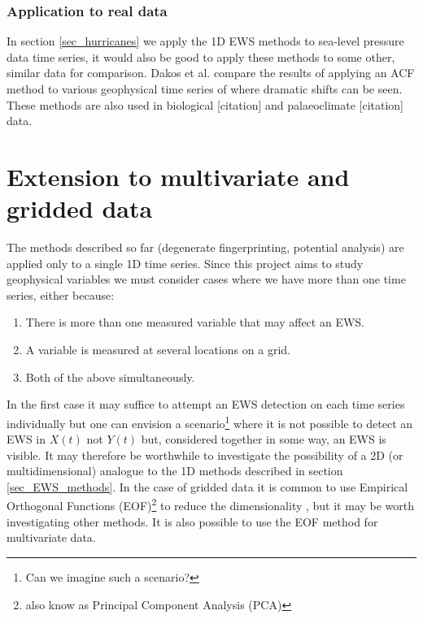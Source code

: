 \documentclass[11pt,a4paper,reqno]{article}
\numberwithin{equation}{section}
\begin{document}
\subsubsection{Application to real data}
\label{sec_realdata}

In section \ref{sec_hurricanes} we apply the 1D EWS methods to sea-level pressure data time series, it would also be good to apply these methods to some other, similar data for comparison. Dakos et al. \cite{dakos2012} compare the results of applying an ACF method to various geophysical time series of where dramatic shifts can be seen. These methods are also used in biological [citation] and palaeoclimate [citation] data. 


\section{Extension to multivariate and gridded data}
\label{sec_gridded}

The methods described so far (degenerate fingerprinting, potential analysis) are applied only to a single 1D time series. Since this project aims to study geophysical variables we must consider cases where we have more than one time series, either because:
\begin{enumerate}
\item There is more than one measured variable that may affect an EWS.
\item A variable is measured at several locations on a grid. 
\item Both of the above simultaneously. 
\end{enumerate}
In the first case it may suffice to attempt an EWS detection on each time series individually but one can envision a scenario\footnote{Can we imagine such a scenario?}\marginpar{\large $\star$} where it is not possible to detect an EWS in $X(t)$ not $Y(t)$ but, considered together in some way, an EWS is visible. It may therefore be worthwhile to investigate the possibility of a 2D (or multidimensional) analogue to the 1D methods described in section \ref{sec_EWS_methods}. In the case of gridded data it is common to use Empirical Orthogonal Functions (EOF)\footnote{also know as Principal Component Analysis (PCA)} to reduce the dimensionality \cite[Chapter~13]{vonstorch}, but it may be worth investigating other methods. It is also possible to use the EOF method for multivariate data.
\end{document}
